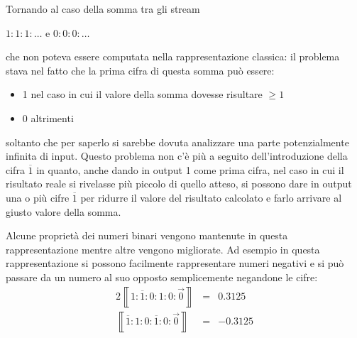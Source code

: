 \documentclass[Lau,oneside]{sapthesis}
\begin{document}
Tornando al caso della somma tra gli stream
\begin{center}
$1:1:1:\ldots$ \hspace{0.5cm} e \hspace{0.5cm} $0:0:0:\ldots$
\end{center}
che non poteva essere computata nella rappresentazione classica: il problema stava nel fatto che la prima cifra di questa somma può essere:
\begin{itemize}
\item 1 nel caso in cui il valore della somma dovesse risultare $\geq1$
\item 0 altrimenti
\end{itemize}
soltanto che per saperlo si sarebbe dovuta analizzare una parte potenzialmente infinita di input. Questo problema non c'è più a seguito dell'introduzione della cifra $\overline{1}$ in quanto, anche dando in output 1 come prima cifra, nel caso in cui il risultato reale si rivelasse più piccolo di quello atteso, si possono dare in output una o più cifre $\overline{1}$ per ridurre il valore del risultato calcolato e farlo arrivare al giusto valore della somma.

Alcune proprietà dei numeri binari vengono mantenute in questa rappresentazione mentre altre vengono migliorate. Ad esempio in questa rappresentazione si possono facilmente rappresentare numeri negativi e si può passare da un numero al suo opposto semplicemente negandone le cifre:
\begin{alignat*}{2}
\left\llbracket 1:\overline{1}:0:1:0:\overrightarrow{0} \right\rrbracket &{} = {}& 0.3125\\
\left\llbracket \overline{1}:1:0:\overline{1}:0:\overrightarrow{0} \right\rrbracket &{} = {}& -0.3125
\end{alignat*}
\end{document}
